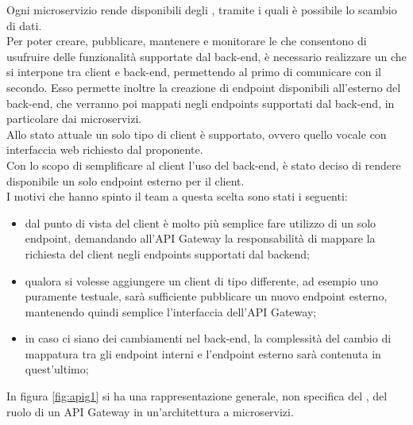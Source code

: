 Ogni microservizio rende disponibili degli , tramite i quali è possibile lo scambio di dati. \\
Per poter creare, pubblicare, mantenere e monitorare le  che consentono di usufruire delle funzionalità supportate dal back-end, è necessario realizzare un  che si interpone tra client e back-end, permettendo al primo di comunicare con il secondo.
Esso permette inoltre la creazione di endpoint disponibili all'esterno del back-end, che verranno poi mappati negli endpoints supportati dal back-end, in particolare dai microservizi.\\
Allo stato attuale un solo tipo di client è supportato, ovvero quello vocale con interfaccia web richiesto dal proponente.\\
Con lo scopo di semplificare al client l'uso del back-end, è stato deciso di rendere disponibile un solo endpoint esterno per il client. \\
I motivi che hanno spinto il team a questa scelta sono stati i seguenti:
\begin{itemize}
	\item dal punto di vista del client è molto più semplice fare utilizzo di un solo endpoint, demandando all'API Gateway la responsabilità di mappare la richiesta del client negli endpoints supportati dal backend;
	\item qualora si volesse aggiungere un client di tipo differente, ad esempio uno puramente testuale, sarà sufficiente pubblicare un nuovo endpoint esterno, mantenendo quindi semplice l'interfaccia dell'API Gateway;
	\item in caso ci siano dei cambiamenti nel back-end, la complessità del cambio di mappatura tra gli endpoint interni e l'endpoint esterno sarà contenuta in quest'ultimo;
\end{itemize}

In figura \ref{fig:apig1} si ha una rappresentazione generale, non specifica del  \PROGETTO, del ruolo di un API Gateway in un'architettura a microservizi.\\

